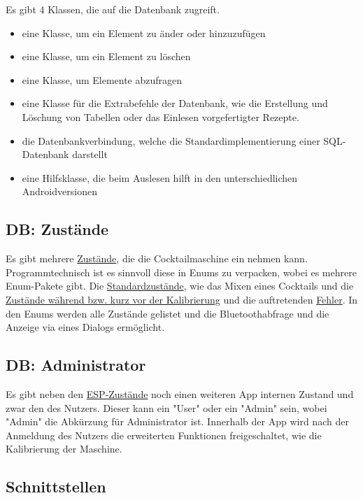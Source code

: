 Es gibt 4 Klassen, die auf die Datenbank zugreift.
\begin{itemize}
	\item eine Klasse, um ein Element zu änder oder hinzuzufügen 
	\item eine Klasse, um ein Element zu löschen
	\item eine Klasse, um Elemente abzufragen
	\item eine Klasse für die Extrabefehle der Datenbank, wie die Erstellung und Löschung von Tabellen  oder das Einlesen vorgefertigter Rezepte.
	\item die Datenbankverbindung, welche die Standardimplementierung einer SQL-Datenbank darstellt
	\item eine Hilfsklasse, die beim Auslesen hilft in den unterschiedlichen Androidversionen
\end{itemize}



\subsection{DB: Zustände}
\label{sec:dbstatus}

Es gibt mehrere \hyperref[sec:status]{Zustände}, die die Cocktailmaschine ein nehmen kann. Programmtechnisch ist es sinnvoll diese in Enums zu verpacken, wobei es mehrere Enum-Pakete gibt. Die \hyperref[sec:statusrez]{Standardzustände}, wie das Mixen eines Cocktails und die \hyperref[sec:statuscal]{Zustände während bzw. kurz vor der Kalibrierung} und die auftretenden \hyperref[sec:statuserror]{Fehler}. In den Enums werden alle Zustände gelistet und die Bluetoothabfrage und die Anzeige via eines Dialogs ermöglicht.

\subsection{DB: Administrator}

Es gibt neben den \hyperref[sec:dbstatus]{ESP-Zustände} noch einen weiteren App internen Zustand und zwar den des Nutzers. Dieser kann ein "User" oder ein "Admin" sein, wobei "Admin" die Abkürzung für Administrator ist. Innerhalb der App wird nach der Anmeldung des Nutzers die erweiterten Funktionen freigeschaltet, wie die Kalibrierung der Maschine. 

\subsection{Schnittstellen}


